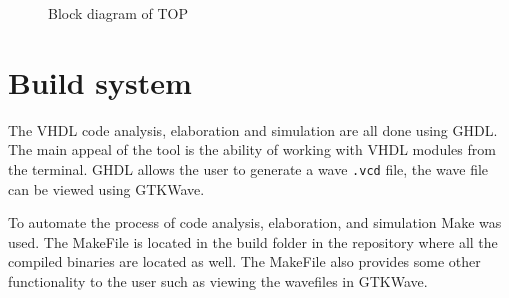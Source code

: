 \begin{figure}[h]
    \centering
    
    \caption{Block diagram of TOP}
    \label{fig:final_sys_overview}
\end{figure}

\section{Build system}

The VHDL code analysis, elaboration and simulation are all done using GHDL. The main appeal of the tool is the ability of working with VHDL modules from the terminal. GHDL allows the user to generate a wave \texttt{.vcd} file, the wave file can be viewed using GTKWave.

To automate the process of code analysis, elaboration, and simulation Make was used. The MakeFile is located in the build folder in the repository where all the compiled binaries are located as well. The MakeFile also provides some other functionality to the user such as viewing the wavefiles in GTKWave.

